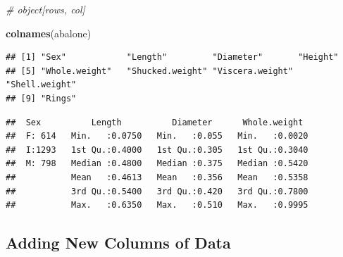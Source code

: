 \documentclass[
]{book}
\newenvironment{Shaded}{\begin{snugshade}}{\end{snugshade}}
\newcommand{\AttributeTok}[1]{\textcolor[rgb]{0.13,0.29,0.53}{#1}}
\newcommand{\CommentTok}[1]{\textcolor[rgb]{0.56,0.35,0.01}{\textit{#1}}}
\newcommand{\DecValTok}[1]{\textcolor[rgb]{0.00,0.00,0.81}{#1}}
\newcommand{\FunctionTok}[1]{\textcolor[rgb]{0.13,0.29,0.53}{\textbf{#1}}}
\newcommand{\NormalTok}[1]{#1}
\newcommand{\OtherTok}[1]{\textcolor[rgb]{0.56,0.35,0.01}{#1}}
\newcommand{\SpecialCharTok}[1]{\textcolor[rgb]{0.81,0.36,0.00}{\textbf{#1}}}
\newcommand{\StringTok}[1]{\textcolor[rgb]{0.31,0.60,0.02}{#1}}
\begin{document}
\begin{Shaded}
\begin{Highlighting}[]
\CommentTok{\# object[rows, col]}

\FunctionTok{colnames}\NormalTok{(abalone)}
\end{Highlighting}
\end{Shaded}

\begin{verbatim}
## [1] "Sex"            "Length"         "Diameter"       "Height"        
## [5] "Whole.weight"   "Shucked.weight" "Viscera.weight" "Shell.weight"  
## [9] "Rings"
\end{verbatim}

\begin{Shaded}
\end{Shaded}

\begin{verbatim}
##  Sex          Length          Diameter      Whole.weight   
##  F: 614   Min.   :0.0750   Min.   :0.055   Min.   :0.0020  
##  I:1293   1st Qu.:0.4000   1st Qu.:0.305   1st Qu.:0.3040  
##  M: 798   Median :0.4800   Median :0.375   Median :0.5420  
##           Mean   :0.4613   Mean   :0.356   Mean   :0.5358  
##           3rd Qu.:0.5400   3rd Qu.:0.420   3rd Qu.:0.7800  
##           Max.   :0.6350   Max.   :0.510   Max.   :0.9995
\end{verbatim}

\subsection{Adding New Columns of Data}\label{adding-new-columns-of-data}
\end{document}
